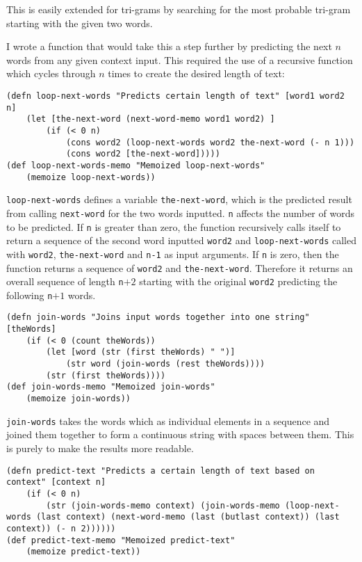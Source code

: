 This is easily extended for tri-grams by searching for the most probable tri-gram starting with the given two words.

I wrote a function that would take this a step further by predicting the next $n$ words from any given context input. This required the use of a recursive function which cycles through $n$ times to create the desired length of text:

\begin{lstlisting}
(defn loop-next-words "Predicts certain length of text" [word1 word2 n] 
	(let [the-next-word (next-word-memo word1 word2) ]
		(if (< 0 n)  
			(cons word2 (loop-next-words word2 the-next-word (- n 1))) 
			(cons word2 [the-next-word])))) 
(def loop-next-words-memo "Memoized loop-next-words" 
	(memoize loop-next-words))
\end{lstlisting}

\lstinline!loop-next-words! defines a variable \lstinline!the-next-word!, which is the predicted result from calling \lstinline!next-word! for the two words inputted. \lstinline!n! affects the number of words to be predicted. If \lstinline!n! is greater than zero, the function recursively calls itself to return a sequence of the second word inputted \lstinline!word2! and \lstinline!loop-next-words! called with \lstinline!word2!, \lstinline!the-next-word! and \lstinline!n-1! as input arguments. If \lstinline!n! is zero, then the function returns a sequence of \lstinline!word2! and \lstinline!the-next-word!. Therefore it returns an overall sequence of length \lstinline!n!$+2$ starting with the original \lstinline!word2! predicting the following \lstinline!n!$+1$ words.

\begin{lstlisting}
(defn join-words "Joins input words together into one string" [theWords] 
	(if (< 0 (count theWords)) 
		(let [word (str (first theWords) " ")] 
			(str word (join-words (rest theWords)))) 
		(str (first theWords))))
(def join-words-memo "Memoized join-words" 
	(memoize join-words))
\end{lstlisting}

\lstinline!join-words! takes the words which as individual elements in a sequence and joined them together to form a continuous string with spaces between them. This is purely to make the results more readable.

\begin{lstlisting}
(defn predict-text "Predicts a certain length of text based on context" [context n] 
	(if (< 0 n) 
		(str (join-words-memo context) (join-words-memo (loop-next-words (last context) (next-word-memo (last (butlast context)) (last context)) (- n 2)))))) 
(def predict-text-memo "Memoized predict-text" 
	(memoize predict-text))
\end{lstlisting}

